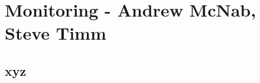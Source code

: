 \chapter{Monitoring - Andrew McNab, Steve Timm}
\label{ch:mon}

\section{xyz}
\label{sec:mon:xyz}  %

